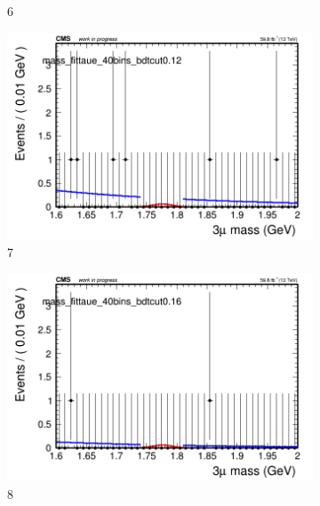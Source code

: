 \begin{figure}[h!]
\begin{subfigure}{0.2\textwidth}
        \caption{6}
    \end{subfigure}
    \begin{subfigure}{0.2\textwidth}
        \includegraphics[width=\textwidth]{unfixed_exp/plots/taue/massfit_taue_40bins_bdtcut0.12.png}
        \caption{7}
    \end{subfigure}
    \begin{subfigure}{0.2\textwidth}
        \includegraphics[width=\textwidth]{unfixed_exp/plots/taue/massfit_taue_40bins_bdtcut0.16.png}
        \caption{8}
    \end{subfigure}
    \begin{subfigure}{0.2\textwidth}

\end{subfigure}
\end{figure}
